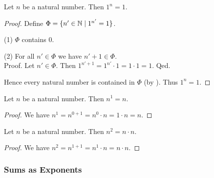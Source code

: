 \documentclass[10pt]{article}
\begin{document}
  \begin{forthel}
    \begin{proposition}[id=ARITHMETIC_09_7376849881530368,printid]
      Let $n$ be a natural number.
      Then $1^{n} = 1$.
    \end{proposition}
    \begin{proof}
      Define $\Phi = \{ n' \in \mathbb{N} \mid 1^{n'} = 1 \}$.

      (1) $\Phi$ contains $0$.

      (2) For all $n' \in \Phi$ we have $n' + 1 \in \Phi$. \\
      Proof.
        Let $n' \in \Phi$.
        Then $1^{n' + 1}
          = 1^{n'} \cdot 1
          = 1 \cdot 1
          = 1$.
      Qed.

      Hence every natural number is contained in $\Phi$ (by ).
      Thus $1^{n} = 1$.
    \end{proof}
  \end{forthel}

  \begin{forthel}
    \begin{proposition}[id=ARITHMETIC_09_4975279749464064,printid]
      Let $n$ be a natural number.
      Then $n^{1} = n$.
    \end{proposition}
    \begin{proof}
      We have $n^{1}
        = n^{0 + 1}
        = n^{0} \cdot n
        = 1 \cdot n
        = n$.
    \end{proof}
  \end{forthel}

  \begin{forthel}
    \begin{proposition}[id=ARITHMETIC_09_8513812055457792,printid]
      Let $n$ be a natural number.
      Then $n^{2} = n \cdot n$.
    \end{proposition}
    \begin{proof}
      We have $n^{2}
        = n^{1 + 1}
        = n^{1} \cdot n
        = n \cdot n$.
    \end{proof}
  \end{forthel}


  \subsubsection*{Sums as Exponents}
\end{document}
